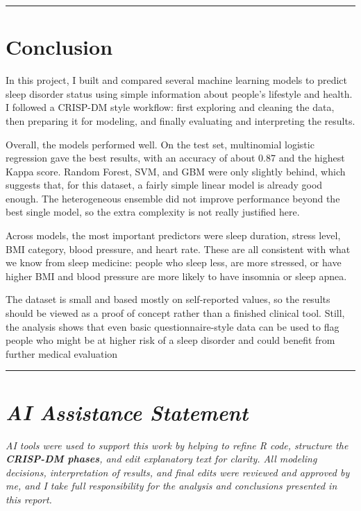 \documentclass[
]{article}
\begin{document}
\begin{center}\rule{0.5\linewidth}{0.5pt}\end{center}

\section{\texorpdfstring{\textbf{Conclusion}}{Conclusion}}\label{conclusion}

In this project, I built and compared several machine learning models to
predict sleep disorder status using simple information about people's
lifestyle and health. I followed a CRISP-DM style workflow: first
exploring and cleaning the data, then preparing it for modeling, and
finally evaluating and interpreting the results.

Overall, the models performed well. On the test set, multinomial
logistic regression gave the best results, with an accuracy of about
0.87 and the highest Kappa score. Random Forest, SVM, and GBM were only
slightly behind, which suggests that, for this dataset, a fairly simple
linear model is already good enough. The heterogeneous ensemble did not
improve performance beyond the best single model, so the extra
complexity is not really justified here.

Across models, the most important predictors were sleep duration, stress
level, BMI category, blood pressure, and heart rate. These are all
consistent with what we know from sleep medicine: people who sleep less,
are more stressed, or have higher BMI and blood pressure are more likely
to have insomnia or sleep apnea.

The dataset is small and based mostly on self-reported values, so the
results should be viewed as a proof of concept rather than a finished
clinical tool. Still, the analysis shows that even basic
questionnaire-style data can be used to flag people who might be at
higher risk of a sleep disorder and could benefit from further medical
evaluation

\begin{center}\rule{0.5\linewidth}{0.5pt}\end{center}

\section{\texorpdfstring{\emph{AI Assistance
Statement}}{AI Assistance Statement}}\label{ai-assistance-statement}

\emph{AI tools were used to support this work by helping to refine R
code, structure the \textbf{CRISP-DM phases}, and edit explanatory text
for clarity. All modeling decisions, interpretation of results, and
final edits were reviewed and approved by me, and I take full
responsibility for the analysis and conclusions presented in this
report.}
\end{document}
